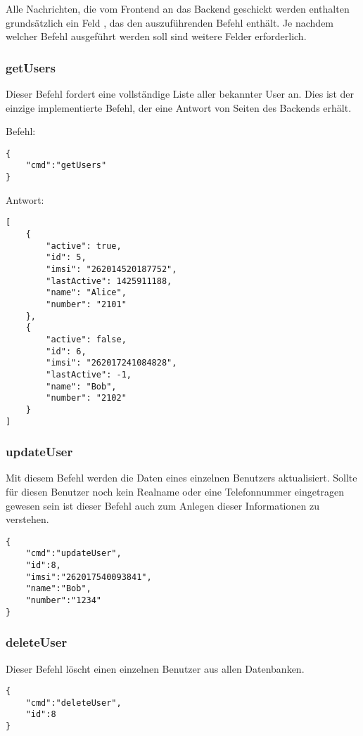 Alle \JSON Nachrichten, die vom Frontend an das Backend geschickt werden enthalten grundsätzlich ein Feld , das den auszuführenden Befehl enthält. Je nachdem welcher Befehl ausgeführt werden soll sind weitere Felder erforderlich.

\subsubsection*{getUsers}
Dieser Befehl fordert eine vollständige Liste aller bekannter User an. Dies ist der einzige implementierte Befehl, der eine Antwort von Seiten des Backends erhält.

Befehl:

\begin{lstlisting}[style=json]
{
	"cmd":"getUsers"
}
\end{lstlisting}

Antwort:

\begin{lstlisting}[style=json]
[
	{
		"active": true,
		"id": 5,
		"imsi": "262014520187752",
		"lastActive": 1425911188,
		"name": "Alice",
		"number": "2101"
	},
	{
		"active": false,
		"id": 6,
		"imsi": "262017241084828",
		"lastActive": -1,
		"name": "Bob",
		"number": "2102"
	}
]
\end{lstlisting}

\subsubsection*{updateUser}

Mit diesem Befehl werden die Daten eines einzelnen Benutzers aktualisiert. Sollte für diesen Benutzer noch kein Realname oder eine Telefonnummer eingetragen gewesen sein ist dieser Befehl auch zum Anlegen dieser Informationen zu verstehen.

\begin{lstlisting}[style=json]
{
	"cmd":"updateUser",
	"id":8,
	"imsi":"262017540093841",
	"name":"Bob",
	"number":"1234"
}
\end{lstlisting}

\subsubsection*{deleteUser}

Dieser Befehl löscht einen einzelnen Benutzer aus allen Datenbanken.

\begin{lstlisting}[style=json]
{
	"cmd":"deleteUser",
	"id":8
}
\end{lstlisting}

